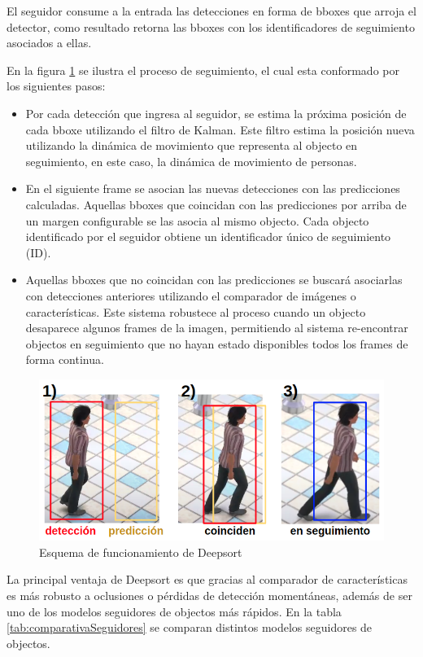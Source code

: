 El seguidor consume a la entrada las detecciones en forma de bboxes que arroja el detector, como resultado retorna las bboxes con los identificadores de seguimiento asociados a ellas. 

\newpage

En la figura \ref{fig:deepsortProcess} se ilustra el proceso de seguimiento, el cual esta conformado por los siguientes pasos:
\begin{itemize}
\item Por cada detección que ingresa al seguidor, se estima la próxima posición de cada bboxe utilizando el filtro de Kalman. Este filtro estima la posición nueva utilizando la dinámica de movimiento que representa al objecto en seguimiento, en este caso, la dinámica de movimiento de personas.
\item En el siguiente frame se asocian las nuevas detecciones con las predicciones calculadas. Aquellas bboxes que coincidan con las predicciones por arriba de un margen configurable se las asocia al mismo objecto. Cada objecto identificado por el seguidor obtiene un identificador único de seguimiento (ID).
\item Aquellas bboxes que no coincidan con las predicciones se buscará asociarlas con detecciones anteriores utilizando el comparador de imágenes o características. Este sistema robustece al proceso cuando un objecto desaparece algunos frames de la imagen, permitiendo al sistema re-encontrar objectos en seguimiento que no hayan estado disponibles todos los frames de forma continua.
\end{itemize}

\begin{figure}[ht]
	\centering
	\includegraphics[scale=.65]{./Figures/deepsortProcess.png}
	\caption{Esquema de funcionamiento de Deepsort}
	\label{fig:deepsortProcess}
\end{figure}

La principal ventaja de Deepsort es que gracias al comparador de características es más robusto a oclusiones o pérdidas de detección momentáneas, además de ser uno de los modelos seguidores de objectos más rápidos. En la tabla \ref{tab:comparativaSeguidores} se comparan distintos modelos seguidores de objectos.

